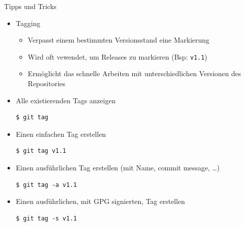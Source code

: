 \begin{frame}{Tipps und Tricks}
  \begin{itemize}
    \item Tagging
    \begin{itemize}
      \item Verpasst einem bestimmten Versionsstand eine Markierung
      \item Wird oft vewendet, um Releases zu markieren (Bsp: \texttt{v1.1})
      \item Ermöglicht das schnelle Arbeiten mit unterschiedlichen Versionen des Repositories
    \end{itemize}
  \item Alle existierenden Tags anzeigen
    \begin{lstlisting}
$ git tag
    \end{lstlisting}
  \item Einen einfachen Tag erstellen
    \begin{lstlisting}
$ git tag v1.1
    \end{lstlisting}
  \item Einen ausführlichen Tag erstellen (mit Name, commit message, \ldots)
    \begin{lstlisting}
$ git tag -a v1.1
    \end{lstlisting}
  \item Einen ausführlichen, mit GPG signierten, Tag erstellen
    \begin{lstlisting}
$ git tag -s v1.1
    \end{lstlisting}
  \end{itemize}
\end{frame}

